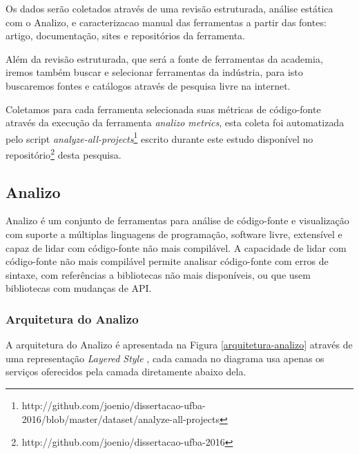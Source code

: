Os dados serão coletados através de uma revisão estruturada, análise estática
com o Analizo, e caracterizacao manual das ferramentas a partir das fontes:
artigo, documentação, sites e repositórios da ferramenta.

Além da revisão estruturada, que será a fonte de ferramentas da academia,
iremos também buscar e selecionar ferramentas da indústria, para isto
buscaremos fontes e catálogos através de pesquisa livre na internet.

Coletamos para cada ferramenta selecionada suas métricas de código-fonte
através da execução da ferramenta {\it analizo metrics}, esta coleta foi
automatizada pelo script {\it
analyze-all-projects}\footnote{http://github.com/joenio/dissertacao-ufba-2016/blob/master/dataset/analyze-all-projects}
escrito durante este estudo disponível no
repositório\footnote{http://github.com/joenio/dissertacao-ufba-2016} desta
pesquisa.

\subsection{Analizo} \label{analizo}

Analizo é um conjunto de ferramentas para análise de código-fonte e
visualização com suporte a múltiplas linguagens de programação, software livre,
extensível e capaz de lidar com código-fonte não mais compilável. A capacidade
de lidar com código-fonte não mais compilável permite analisar código-fonte
com erros de sintaxe, com referências a bibliotecas não mais disponíveis, ou
que usem bibliotecas com mudanças de API.


\subsubsection{Arquitetura do Analizo}

A arquitetura do Analizo é apresentada na Figura \ref{arquitetura-analizo}
através de uma representação {\it Layered Style} \cite{Clements2002}, cada
camada no diagrama usa apenas os serviços oferecidos pela camada diretamente
abaixo dela.

